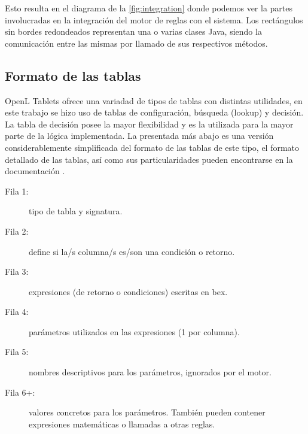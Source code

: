 Esto resulta en el diagrama de la \cref{fig:integration} donde podemos ver la partes involucradas en la integración del motor de reglas con el sistema. Los rectángulos sin bordes redondeados representan una o varias clases Java, siendo la comunicación entre las mismas por llamado de sus respectivos métodos.

\begin{figure*}
    \centering
    \caption{Integración OpenL Tablets con SI-DOSPU}
    \label{fig:integration}
\end{figure*}

\subsection{Formato de las tablas}
OpenL Tablets ofrece una variadad de tipos de tablas con distintas utilidades, en este trabajo se hizo uso de tablas de configuración, búsqueda (lookup) y decisión. La tabla de decisión posee la mayor flexibilidad y es la utilizada para la mayor parte de la lógica implementada. La presentada más abajo es una versión considerablemente simplificada del formato de las tablas de este tipo, el formato detallado de las tablas, así como sus particularidades pueden encontrarse en la documentación \cite{openl-decision-table}.

\begin{description}
    \item[Fila 1: ] tipo de tabla y signatura.
    \item[Fila 2: ] define si la/s columna/s es/son una condición o retorno.
    \item[Fila 3: ] expresiones (de retorno o condiciones) escritas en \acrshort{bex}.
    \item[Fila 4: ] parámetros utilizados en las expresiones (1 por columna).
    \item[Fila 5: ] nombres descriptivos para los parámetros, ignorados por el motor.
    \item[Fila 6+:] valores concretos para los parámetros. También pueden contener expresiones matemáticas o llamadas a otras reglas.
\end{description}

